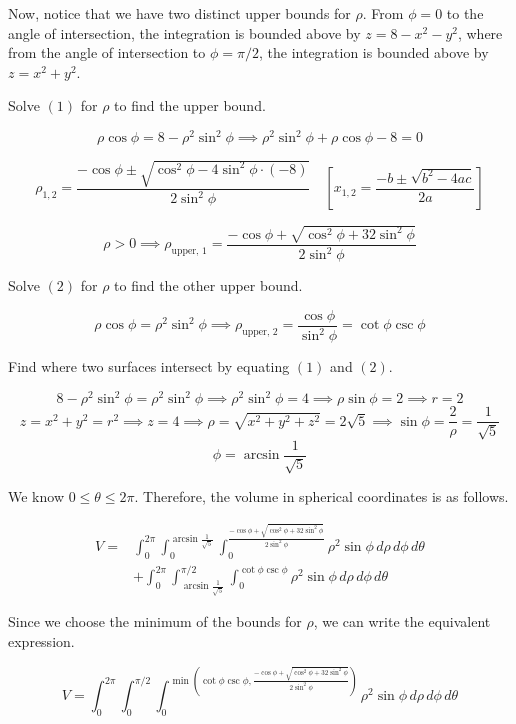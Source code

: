 \documentclass{article}
\begin{document}
Now, notice that we have two distinct upper bounds for $\rho$. From $\phi=0$ to the angle of intersection, the integration is bounded above by $z=8-x^2-y^2$, where from the angle of intersection to $\phi=\pi/2$, the integration is bounded above by $z=x^2+y^2$.

Solve $(1)$ for $\rho$ to find the upper bound.

\[\rho\cos\phi=8-\rho^2\sin^2\phi\implies\rho^2\sin^2\phi+\rho\cos\phi-8=0\]

\[\rho_{1,2}=\frac{-\cos\phi\pm\sqrt{\cos^2\phi-4\sin^2\phi\cdot(-8)}}{2\sin^2\phi}\quad\left[x_{1,2}=\frac{-b\pm\sqrt{b^2-4ac}}{2a}\right]\]

\[\rho>0\implies \rho_{\text{upper, 1}}=\frac{-\cos\phi+\sqrt{\cos^2\phi+32\sin^2\phi}}{2\sin^2\phi}\]

Solve $(2)$ for $\rho$ to find the other upper bound.

\[\rho\cos\phi=\rho^2\sin^2\phi\implies\rho_{\text{upper, 2}}=\frac{\cos\phi}{\sin^2\phi}=\cot\phi\csc\phi\]

Find where two surfaces intersect by equating $(1)$ and $(2)$.

\[8-\rho^2\sin^2\phi=\rho^2\sin^2\phi\implies \rho^2\sin^2\phi=4\implies \rho\sin\phi=2\implies r=2\]
\[z=x^2+y^2=r^2\implies z=4\implies \rho=\sqrt{x^2+y^2+z^2}=2\sqrt5\implies \sin\phi=\frac2\rho=\frac1{\sqrt{5}}\]
\[\phi=\arcsin\frac1{\sqrt5}\]

We know $0\leq\theta\leq2\pi$. Therefore, the volume in spherical coordinates is as follows.

\begin{equation*}
\boxed{\begin{array}{ll}
V=&\displaystyle\int_0^{2\pi}\int_0^{\arcsin\textstyle\frac1{\sqrt5}}\int_0^{\textstyle\frac{-\cos\phi+\sqrt{\cos^2\phi+32\sin^2\phi}}{2\sin^2\phi}}\rho^2\sin\phi\,d\rho\,d\phi\,d\theta\\[1em]
&\displaystyle+\int_0^{2\pi}\int_{\arcsin\textstyle\frac1{\sqrt5}}^{\pi/2}\int_0^{\cot\phi\csc\phi}\rho^2\sin\phi\,d\rho\,d\phi\,d\theta
\end{array}}
\end{equation*}

Since we choose the minimum of the bounds for $\rho$, we can write the equivalent expression.

\[\boxed{V=\displaystyle\int_0^{2\pi}\int_0^{\pi/2}\int_0^{\min\left(\cot\phi\csc\phi,\textstyle\frac{-\cos\phi+\sqrt{\cos^2\phi+32\sin^2\phi}}{2\sin^2\phi}\right)}\rho^2\sin\phi\,d\rho\,d\phi\,d\theta}\]
\end{document}
